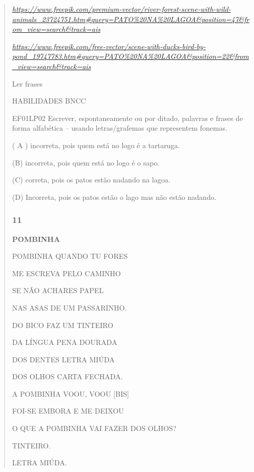 \begin{escola}
{\begin{verse}
\href{https://www.freepik.com/premium-vector/river-forest-scene-with-wild-animals_23724751.htm\#query=PATO\%20NA\%20LAGOA\&position=47\&from_view=search\&track=ais}{\emph{https://www.freepik.com/premium-vector/river-forest-scene-with-wild-animals\_23724751.htm\#query=PATO\%20NA\%20LAGOA\&position=47\&from\_view=search\&track=ais}}

\href{https://www.freepik.com/free-vector/scene-with-ducks-bird-by-pond_19747783.htm\#query=PATO\%20NA\%20LAGOA\&position=22\&from_view=search\&track=ais}{\emph{https://www.freepik.com/free-vector/scene-with-ducks-bird-by-pond\_19747783.htm\#query=PATO\%20NA\%20LAGOA\&position=22\&from\_view=search\&track=ais}}

Ler frases

HABILIDADES BNCC

EF01LP02 Escrever, espontaneamente ou por ditado, palavras e frases de
forma alfabética -- usando letras/grafemas que representem fonemas.

( A ) incorreta, pois quem está no logo é a tartaruga.

(B) incorreta, pois quem está no logo é o sapo.

(C) correta, pois os patos estão nadando na lagoa.

(D) Incorreta, pois os patos estão o lago mas não estão nadando.

\subsubsection{11 }\label{section-83}

\textbf{POMBINHA}

POMBINHA QUANDO TU FORES

ME ESCREVA PELO CAMINHO

SE NÃO ACHARES PAPEL

NAS ASAS DE UM PASSARINHO.

DO BICO FAZ UM TINTEIRO

DA LÍNGUA PENA DOURADA

DOS DENTES LETRA MIÚDA

DOS OLHOS CARTA FECHADA.

A POMBINHA VOOU, VOOU {[}BIS{]}

FOI-SE EMBORA E ME DEIXOU

O QUE A POMBINHA VAI FAZER DOS OLHOS?

\begin{escolha}
\item TINTEIRO.

\item LETRA MIÚDA.


\end{escolha}
\end{verse}}
\end{escola}
